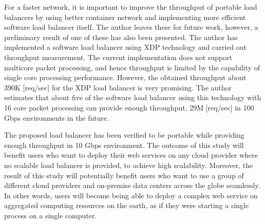 For a faster network, it is important to improve the throughput of portable load balancers by using better container network and implementing more efficient software load balancer itself.
The author leaves these for future work, however, a preliminary result of one of these has also been presented.
The author has implemented a software load balancer using XDP technology and carried out throughput measurement.
The current implementation does not support multicore packet processing, and hence throughput is limited by the capability of single core processing performance.
However, the obtained throughput about 390K [req/sec] for the XDP load balancer is very promising.
The author estimates that about five of the software load balancer using this technology with 16 core packet processing can provide enough throughput, 29M [req/sec] in 100 Gbps environments in the future. 

The proposed load balancer has been verified to be portable while providing enough throughput in 10 Gbps environment.
The outcome of this study will benefit users who want to deploy their web services on any cloud provider where no scalable load balancer is provided, to achieve high scalability.
Moreover, the result of this study will potentially benefit users who want to use a group of different cloud providers and on-premise data centers across the globe seamlessly.
In other words, users will become being able to deploy a complex web service on aggregated computing resources on the earth, as if they were starting a single process on a single computer.



 
